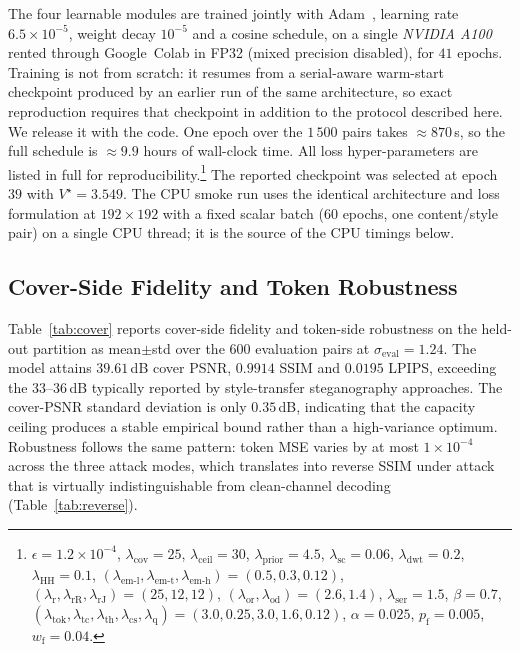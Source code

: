 \documentclass[conference]{IEEEtran}
\begin{document}
The four learnable modules are trained jointly with Adam~\cite{adam}, learning rate $6.5\!\times\!10^{-5}$, weight decay $10^{-5}$ and a cosine schedule, on a single \emph{NVIDIA A100} rented through Google~Colab in FP32 (mixed precision disabled), for $41$ epochs. Training is not from scratch: it resumes from a serial-aware warm-start checkpoint produced by an earlier run of the same architecture, so exact reproduction requires that checkpoint in addition to the protocol described here. We release it with the code. One epoch over the $1\,500$ pairs takes $\approx\!870$\,s, so the full schedule is $\approx\!9.9$ hours of wall-clock time. All loss hyper-parameters are listed in full for reproducibility.\footnote{$\epsilon\!=\!1.2\!\times\!10^{-4}$, $\lambda_{\text{cov}}\!=\!25$, $\lambda_{\text{ceil}}\!=\!30$, $\lambda_{\text{prior}}\!=\!4.5$, $\lambda_{\text{sc}}\!=\!0.06$, $\lambda_{\text{dwt}}\!=\!0.2$, $\lambda_{\text{HH}}\!=\!0.1$, $(\lambda_{\text{em-l}},\lambda_{\text{em-t}},\lambda_{\text{em-h}})\!=\!(0.5,0.3,0.12)$, $(\lambda_{\text{r}},\lambda_{\text{rR}},\lambda_{\text{rJ}})\!=\!(25,12,12)$, $(\lambda_{\text{or}},\lambda_{\text{od}})\!=\!(2.6,1.4)$, $\lambda_{\text{ser}}\!=\!1.5$, $\beta\!=\!0.7$, $(\lambda_{\text{tok}},\lambda_{\text{tc}},\lambda_{\text{th}},\lambda_{\text{cs}},\lambda_{\text{q}})\!=\!(3.0,0.25,3.0,1.6,0.12)$, $\alpha\!=\!0.025$, $p_{\text{f}}\!=\!0.005$, $w_{\text{f}}\!=\!0.04$.} The reported checkpoint was selected at epoch~$39$ with $V^{\star}\!=\!3.549$. The CPU smoke run uses the identical architecture and loss formulation at $192\!\times\!192$ with a fixed scalar batch ($60$ epochs, one content/style pair) on a single CPU thread; it is the source of the CPU timings below.

\subsection{Cover-Side Fidelity and Token Robustness}
\label{sec:exp_coco}
Table~\ref{tab:cover} reports cover-side fidelity and token-side robustness on the held-out partition as mean$\pm$std over the $600$ evaluation pairs at $\sigma_{\text{eval}}\!=\!1.24$. The model attains $39.61$\,dB cover PSNR, $0.9914$ SSIM and $0.0195$ LPIPS, exceeding the $33$--$36$\,dB typically reported by style-transfer steganography approaches. The cover-PSNR standard deviation is only $0.35$\,dB, indicating that the capacity ceiling produces a stable empirical bound rather than a high-variance optimum. Robustness follows the same pattern: token MSE varies by at most $1\!\times\!10^{-4}$ across the three attack modes, which translates into reverse SSIM under attack that is virtually indistinguishable from clean-channel decoding (Table~\ref{tab:reverse}).
\end{document}
